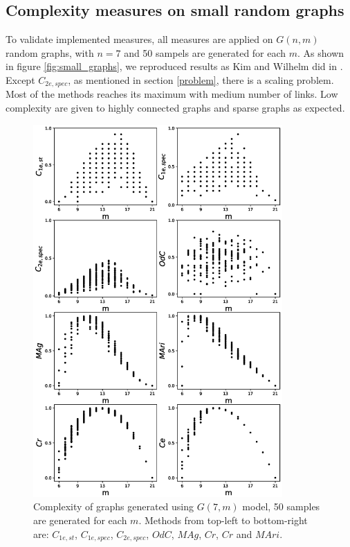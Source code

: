 \documentclass[12pt]{article}
\begin{document}
{\subsection{Complexity measures on small random graphs}
\label{complexity}
To validate implemented measures, all measures are applied on $G(n,m)$ random graphs, with $n=7$ and 50 sampels are generated for each $m$. As shown in figure \ref{fig:small_graphs}, we reproduced results as Kim and Wilhelm did in \cite{KIM20082637}. Except $C_{2e,spec}$, as mentioned in section \ref{problem}, there is a scaling problem. Most of the methods reaches its maximum with medium number of links. Low complexity are given to highly connected graphs and sparse graphs as expected.
\clearpage
\newpage
\begin{figure}[p!]
    \includegraphics[width=0.85\textwidth]{complexities.eps}
    \vspace*{-0.8in}
    \centering
    \caption{Complexity of graphs generated using $G(7,m)$ model, 50 samples are generated for each $m$. Methods from top-left to bottom-right are: $C_{1e,st}$, $C_{1e,spec}$, $C_{2e,spec}$, $OdC$, $MAg$, $Cr$, $Cr$ and $MAri$.}

\end{figure}}
\end{document}
